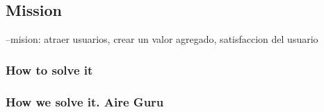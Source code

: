 \subsection{Mission}
--mision: atraer usuarios, crear un valor agregado, satisfaccion del usuario

\subsubsection{How to solve it} 


\subsubsection{How we solve it. Aire Guru} 
 
\begin{itemize}
    \done
    \crossed
    
\end{itemize}
\newpage